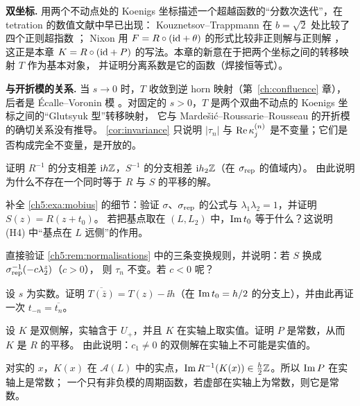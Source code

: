 \textbf{双坐标.} 用两个不动点处的 Koenigs 坐标描述一个超越函数的``分数次迭代''，在 tetration 的数值文献中早已出现：
Kouznetsov--Trappmann 在 $b=\sqrt2$ 处比较了四个正则超指数 \cite{KouznetsovTrappmann2010}；
Nixon 用 $F=R\circ(\mathrm{id}+\theta)$ 的形式比较非正则解与正则解 \cite{Nixon2022}，
这正是本章 $K=R\circ(\mathrm{id}+P)$ 的写法。本章的新意在于把两个坐标之间的转移映射 $T$ 作为基本对象，
并证明分离系数是它的函数（焊接恒等式）。

\textbf{与开折模的关系.} 当 $s\to0$ 时，$T$ 收敛到逆 horn 映射（第~\ref{ch:confluence} 章），后者是 Écalle--Voronin 模
\cite{Ecalle1981,Voronin1981}。对固定的 $s>0$，$T$ 是两个双曲不动点的 Koenigs 坐标之间的``Glutsyuk 型''转移映射，
它与 Marde\v{s}i\'c--Roussarie--Rousseau 的开折模 \cite{MRR2004} 的确切关系没有推导。
\cref{cor:invariance} 只说明 $|\tau_n|$ 与 $\operatorname{Re}\kappa^{(n)}_j$ 是不变量；它们是否构成完全不变量，是开放的。

\exercises

\begin{exercise}\label{ch5:ex:period}
证明 $R^{-1}$ 的分支相差 $\mathrm{i} h\mathbb{Z}$，$S^{-1}$ 的分支相差 $\mathrm{i} h_2\mathbb{Z}$（在 $\sigma_{\rm rep}$ 的值域内）。
由此说明为什么不存在一个同时等于 $R$ 与 $S$ 的平移的解。
\end{exercise}

\begin{exercise}\label{ch5:ex:mobius}
补全 \cref{ch5:exa:mobius} 的细节：验证 $\sigma$、$\sigma_{\rm rep}$ 的公式与 $\lambda_1\lambda_2=1$，并证明 $S(z)=R(z+t_0)$。
若把基点取在 $(L,L_2)$ 中，$\operatorname{Im} t_0$ 等于什么？这说明 (H4) 中``基点在 $L$ 远侧''的作用。
\end{exercise}

\begin{exercise}\label{ch5:ex:translations}
直接验证 \cref{ch5:rem:normalisations} 中的三条变换规则，并说明：若 $S$ 换成 $\sigma_{\rm rep}^{-1}(-c\lambda_2^z)$（$c>0$），
则 $\tau_n$ 不变。若 $c<0$ 呢？
\end{exercise}

\begin{exercise}\label{ch5:ex:conj}
设 $s$ 为实数。证明 $\overline{T(\bar z)}=T(z)-\ii h$（在 $\operatorname{Im} t_0=h/2$ 的分支上），并由此再证一次 $t_{-n}=\overline{t_n}$。
\end{exercise}

\begin{exercise}\label{ch5:ex:real-K}
设 $K$ 是双侧解，实轴含于 $U_+$，并且 $K$ 在实轴上取实值。证明 $P$ 是常数，从而 $K$ 是 $R$ 的平移。
由此说明：$c_1\ne0$ 的双侧解在实轴上不可能是实值的。
\end{exercise}
\begin{hint}
对实的 $x$，$K(x)$ 在 $\mathcal A(L)$ 中的实点，$\operatorname{Im} R^{-1}(K(x))\in\frac h2\mathbb{Z}$。所以 $\operatorname{Im} P$ 在实轴上是常数；
一个只有非负模的周期函数，若虚部在实轴上为常数，则它是常数。
\end{hint}

